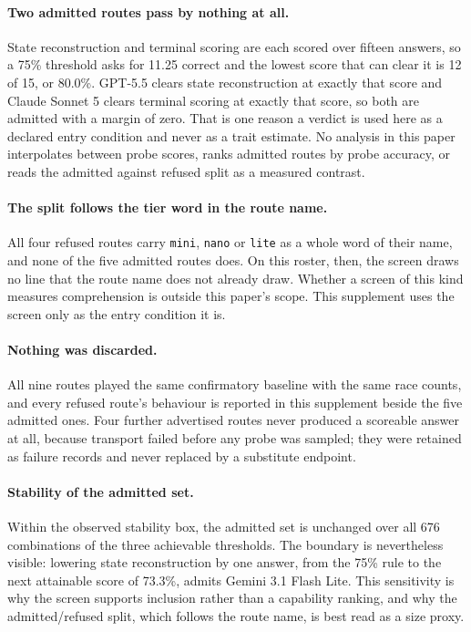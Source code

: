 \documentclass{article}
\begin{document}
\paragraph{Two admitted routes pass by nothing at all.} State reconstruction
and terminal scoring are each scored over fifteen answers, so a 75\% threshold
asks for 11.25 correct and the lowest score that can clear it is 12 of 15, or
80.0\%. GPT-5.5 clears state reconstruction at exactly that score and Claude
Sonnet 5 clears terminal scoring at exactly that score, so both are admitted
with a margin of zero. That is one reason a verdict is used here as a declared
entry condition and never as a trait estimate. No analysis in this paper
interpolates between probe scores, ranks admitted routes by probe accuracy, or
reads the admitted against refused split as a measured contrast.

\paragraph{The split follows the tier word in the route name.} All four
refused routes carry \texttt{mini}, \texttt{nano} or \texttt{lite} as a whole
word of their name, and none of the five admitted routes does. On this roster,
then, the screen draws no line that the route name does not already draw.
Whether a screen of this kind measures comprehension is outside this paper's
scope. This supplement uses the screen only as the entry condition it is.

\paragraph{Nothing was discarded.} All nine routes played the same confirmatory
baseline with the same race counts, and every refused route's behaviour is
reported in this supplement beside the five admitted ones. Four further
advertised routes never produced a scoreable answer at all, because transport
failed before any probe was sampled; they were retained as failure records and
never replaced by a substitute endpoint.

\paragraph{Stability of the admitted set.} Within the observed stability box,
the admitted set is unchanged over all 676 combinations of the three achievable
thresholds. The boundary is nevertheless visible: lowering state reconstruction
by one answer, from the 75\% rule to the next attainable score of 73.3\%,
admits Gemini 3.1 Flash Lite. This sensitivity is why the screen supports
inclusion rather than a capability ranking, and why the admitted/refused split,
which follows the route name, is best read as a size proxy.
\end{document}
